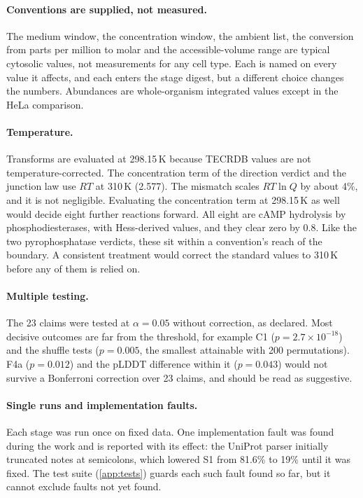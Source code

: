 \paragraph{Conventions are supplied, not measured.}
The medium window, the concentration window, the ambient list, the conversion from parts per million to molar and the accessible-volume range are typical cytosolic values, not measurements for any cell type.
Each is named on every value it affects, and each enters the stage digest, but a different choice changes the numbers.
Abundances are whole-organism integrated values except in the HeLa comparison.

\paragraph{Temperature.}
Transforms are evaluated at 298.15\,K because TECRDB values are not temperature-corrected.
The concentration term of the direction verdict and the junction law use $RT$ at 310\,K (2.577\kJ).
The mismatch scales $RT\ln Q$ by about 4\%, and it is not negligible.
Evaluating the concentration term at 298.15\,K as well would decide eight further reactions forward.
All eight are cAMP hydrolysis by phosphodiesterases, with Hess-derived values, and they clear zero by 0.8\kJ.
Like the two pyrophosphatase verdicts, these sit within a convention's reach of the boundary.
A consistent treatment would correct the standard values to 310\,K before any of them is relied on.

\paragraph{Multiple testing.}
The 23 claims were tested at $\alpha=0.05$ without correction, as declared.
Most decisive outcomes are far from the threshold, for example C1 ($p=2.7\times10^{-18}$) and the shuffle tests ($p=0.005$, the smallest attainable with 200 permutations).
F4a ($p=0.012$) and the pLDDT difference within it ($p=0.043$) would not survive a Bonferroni correction over 23 claims, and should be read as suggestive.

\paragraph{Single runs and implementation faults.}
Each stage was run once on fixed data.
One implementation fault was found during the work and is reported with its effect: the UniProt parser initially truncated notes at semicolons, which lowered S1 from 81.6\% to 19\% until it was fixed.
The test suite (\cref{app:tests}) guards each such fault found so far, but it cannot exclude faults not yet found.

